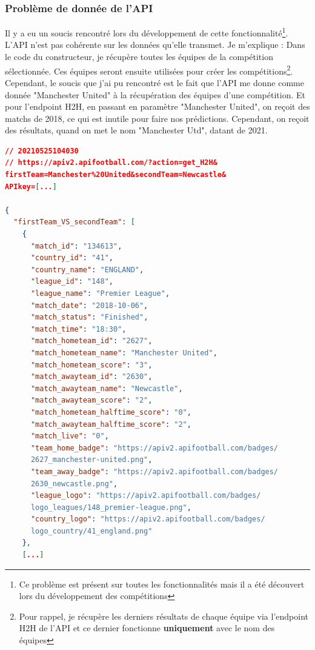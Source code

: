 \documentclass[a4paper,14pt]{extarticle}
\begin{document}
{

\subsubsection{Problème de donnée de l'API}
Il y a eu un soucis rencontré lors du développement de cette fonctionnalité\footnote{Ce problème est présent sur toutes les fonctionnalités mais il a été découvert lors du développement des compétitions}. L'API n'est pas cohérente sur les données qu'elle transmet. Je m'explique :
Dans le code du constructeur, je récupère toutes les équipes de la compétition sélectionnée. Ces équipes seront ensuite utilisées pour créer les compétitions\footnote{Pour rappel, je récupère les derniers résultats de chaque équipe via l'endpoint H2H de l'API et ce dernier fonctionne \textbf{uniquement} avec le nom des équipes}. Cependant, le soucis que j'ai pu rencontré est le fait que l'API me donne comme donnée "Manchester United" à la récupération des équipes d'une compétition. Et pour l'endpoint H2H, en passant en paramètre "Manchester United", on reçoit des matchs de 2018, ce qui est inutile pour faire nos prédictions. Cependant, on reçoit des résultats, quand on met le nom "Manchester Utd", datant de 2021.


\begin{lstlisting}[language=json, firstnumber=1, caption=Aperçu du JSON avec "Manchester United", captionpos=b, label=apercuJSONUnited1]
// 20210525104030
// https://apiv2.apifootball.com/?action=get_H2H&
firstTeam=Manchester%20United&secondTeam=Newcastle&
APIkey=[...]

{
  "firstTeam_VS_secondTeam": [
    {
      "match_id": "134613",
      "country_id": "41",
      "country_name": "ENGLAND",
      "league_id": "148",
      "league_name": "Premier League",
      "match_date": "2018-10-06",
      "match_status": "Finished",
      "match_time": "18:30",
      "match_hometeam_id": "2627",
      "match_hometeam_name": "Manchester United",
      "match_hometeam_score": "3",
      "match_awayteam_id": "2630",
      "match_awayteam_name": "Newcastle",
      "match_awayteam_score": "2",
      "match_hometeam_halftime_score": "0",
      "match_awayteam_halftime_score": "2",
      "match_live": "0",
      "team_home_badge": "https://apiv2.apifootball.com/badges/
      2627_manchester-united.png",
      "team_away_badge": "https://apiv2.apifootball.com/badges/
      2630_newcastle.png",
      "league_logo": "https://apiv2.apifootball.com/badges/
      logo_leagues/148_premier-league.png",
      "country_logo": "https://apiv2.apifootball.com/badges/
      logo_country/41_england.png"
    },
    [...]
\end{lstlisting}

}
\end{document}
